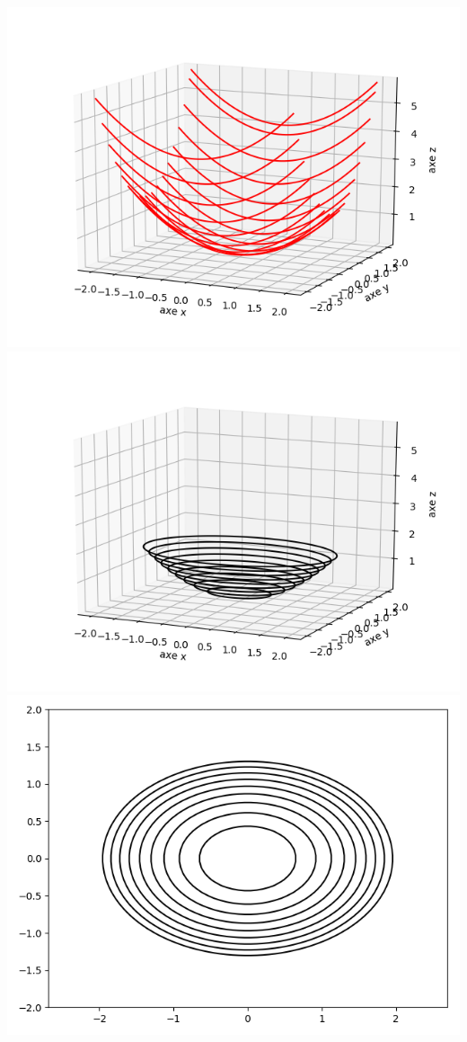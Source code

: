 \documentclass[11pt, class=report,crop=false]{standalone}
\begin{document}
\begin{exemple}
\begin{center}
    \includegraphics[scale=\myscale,scale=0.5]{figures/fonctions-quadra-1c}
    \includegraphics[scale=\myscale,scale=0.5]{figures/fonctions-quadra-1d}
    \includegraphics[scale=\myscale,scale=0.5]{figures/fonctions-quadra-1e}
\end{center}


\end{exemple}
\end{document}
